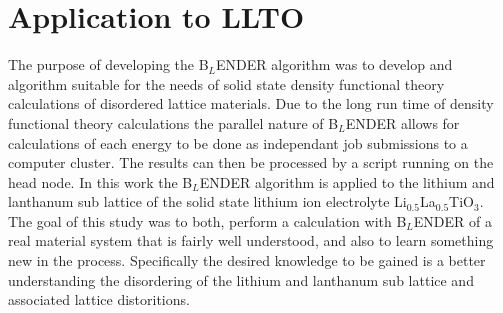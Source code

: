 \documentclass[aps,prl,reprint,superscriptaddress,showkeys]{revtex4-1}
\begin{document}
\section{Application to LLTO}
The purpose of developing the B$_L$ENDER algorithm was to develop and algorithm suitable for the needs of solid state density functional theory calculations of disordered lattice materials.  Due to the long run time of density functional theory calculations  the parallel nature of B$_L$ENDER allows for calculations of each energy to be done as independant job submissions to a computer cluster. The results can then be processed by a script running on the head node.  In this work the B$_L$ENDER algorithm is applied to the lithium and lanthanum sub lattice of the solid state lithium ion electrolyte  Li$_{0.5}$La$_{0.5}$TiO$_{3}$. The goal of this study was to both, perform a calculation with B$_L$ENDER of a real material system that is fairly well understood, and also to learn something new in the process.  Specifically the desired knowledge to be gained is a better understanding the disordering of the lithium and lanthanum sub lattice and associated lattice distoritions. 
\end{document}
